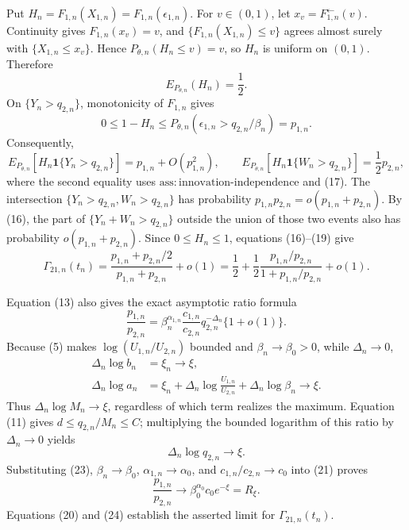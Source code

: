 Put \(H_n=F_{1,n}(X_{1,n})=F_{1,n}(\epsilon_{1,n})\). For \(v\in(0,1)\), let \(x_v=F_{1,n}^{\leftarrow}(v)\). Continuity gives \(F_{1,n}(x_v)=v\), and \(\{F_{1,n}(X_{1,n})\leq v\}\) agrees almost surely with \(\{X_{1,n}\leq x_v\}\). Hence \(P_{\theta,n}(H_n\leq v)=v\), so \(H_n\) is uniform on \((0,1)\). Therefore
\[
E_{P_{\theta,n}}(H_n)=\frac12.
\tag{17}
\]
On \(\{Y_n>q_{2,n}\}\), monotonicity of \(F_{1,n}\) gives
\[
0\leq1-H_n
\leq P_{\theta,n}(\epsilon_{1,n}>q_{2,n}/\beta_n)=p_{1,n}.
\tag{18}
\]
Consequently,
\[
E_{P_{\theta,n}}[H_n\mathbf 1\{Y_n>q_{2,n}\}]
=p_{1,n}+O(p_{1,n}^2),
\qquad
E_{P_{\theta,n}}[H_n\mathbf 1\{W_n>q_{2,n}\}]
=\frac12p_{2,n},
\tag{19}
\]
where the second equality uses \(\mathrm{ass{:}innovation\text{-}independence}\) and (17). The intersection \(\{Y_n>q_{2,n},W_n>q_{2,n}\}\) has probability \(p_{1,n}p_{2,n}=o(p_{1,n}+p_{2,n})\). By (16), the part of \(\{Y_n+W_n>q_{2,n}\}\) outside the union of those two events also has probability \(o(p_{1,n}+p_{2,n})\). Since \(0\leq H_n\leq1\), equations (16)--(19) give
\[
\Gamma_{21,n}(t_n)
=\frac{p_{1,n}+p_{2,n}/2}{p_{1,n}+p_{2,n}}+o(1)
=\frac12+\frac12\frac{p_{1,n}/p_{2,n}}{1+p_{1,n}/p_{2,n}}+o(1).
\tag{20}
\]

Equation (13) also gives the exact asymptotic ratio formula
\[
\frac{p_{1,n}}{p_{2,n}}
=\beta_n^{\alpha_{1,n}}\frac{c_{1,n}}{c_{2,n}}
q_{2,n}^{-\Delta_n}\{1+o(1)\}.
\tag{21}
\]
Because (5) makes \(\log(U_{1,n}/U_{2,n})\) bounded and \(\beta_n\to\beta_0>0\), while \(\Delta_n\to0\),
\[
\begin{split}
\Delta_n\log b_n&=\xi_n\longrightarrow\xi,\\
\Delta_n\log a_n
&=\xi_n+\Delta_n\log\frac{U_{1,n}}{U_{2,n}}
+\Delta_n\log\beta_n\longrightarrow\xi.
\end{split}
\tag{22}
\]
Thus \(\Delta_n\log M_n\to\xi\), regardless of which term realizes the maximum. Equation (11) gives \(d\leq q_{2,n}/M_n\leq C\); multiplying the bounded logarithm of this ratio by \(\Delta_n\to0\) yields
\[
\Delta_n\log q_{2,n}\longrightarrow\xi.
\tag{23}
\]
Substituting (23), \(\beta_n\to\beta_0\), \(\alpha_{1,n}\to\alpha_0\), and \(c_{1,n}/c_{2,n}\to c_0\) into (21) proves
\[
\frac{p_{1,n}}{p_{2,n}}
\longrightarrow
\beta_0^{\alpha_0}c_0e^{-\xi}=R_\xi.
\tag{24}
\]
Equations (20) and (24) establish the asserted limit for \(\Gamma_{21,n}(t_n)\).

